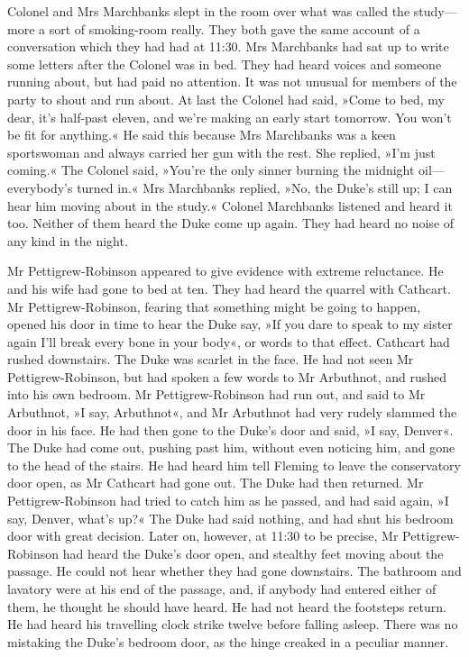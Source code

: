 Colonel and Mrs Marchbanks slept in the room over what was called the study\allowbreak---\allowbreak more a sort of smoking-room really. They both gave the same account of a conversation which they had had at 11:30. Mrs Marchbanks had sat up to write some letters after the Colonel was in bed. They had heard voices and someone running about, but had paid no attention.  It was not unusual for members of the party to shout and run about.  At last the Colonel had said, »Come to bed, my dear, it's half-past eleven, and we're making an early start tomorrow. You won't be fit for anything.« He said this because Mrs Marchbanks was a keen sportswoman and always carried her gun with the rest. She replied, »I'm just coming.« The Colonel said, »You're the only sinner burning the midnight oil\allowbreak---\allowbreak everybody's turned in.« Mrs Marchbanks replied, »No, the Duke's still up; I can hear him moving about in the study.« Colonel Marchbanks listened and heard it too. Neither of them heard the Duke come up again. They had heard no noise of any kind in the night.

Mr Pettigrew-Robinson appeared to give evidence with extreme reluctance. He and his wife had gone to bed at ten. They had heard the quarrel with Cathcart. Mr Pettigrew-Robinson, fearing that something might be going to happen, opened his door in time to hear the Duke say, »If you dare to speak to my sister again I'll break every bone in your body«, or words to that effect. Cathcart had rushed downstairs. The Duke was scarlet in the face. He had not seen Mr  Pettigrew-Robinson, but had spoken a few words to Mr Arbuthnot, and rushed into his own bedroom. Mr Pettigrew-Robinson had run out, and said to Mr Arbuthnot, »I say, Arbuthnot«, and Mr Arbuthnot had very rudely slammed the door in his face. He had then gone to the Duke's door and said, »I say, Denver«. The Duke had come out, pushing past him, without even noticing him, and gone to the head of the stairs. He had heard him tell Fleming to leave the conservatory door open, as Mr Cathcart had gone out. The Duke had then returned. Mr  Pettigrew-Robinson had tried to catch him as he passed, and had said again, »I say, Denver, what's up?« The Duke had said nothing, and had shut his bedroom door with great decision. Later on, however, at 11:30 to be precise, Mr Pettigrew-Robinson had heard the Duke's door open, and stealthy feet moving about the passage. He could not hear whether they had gone downstairs. The bathroom and lavatory were at his end of the passage, and, if anybody had entered either of them, he thought he should have heard. He had not heard the footsteps return. He had heard his travelling clock strike twelve before falling asleep. There was no mistaking the Duke's bedroom door, as the hinge creaked in a peculiar manner.

